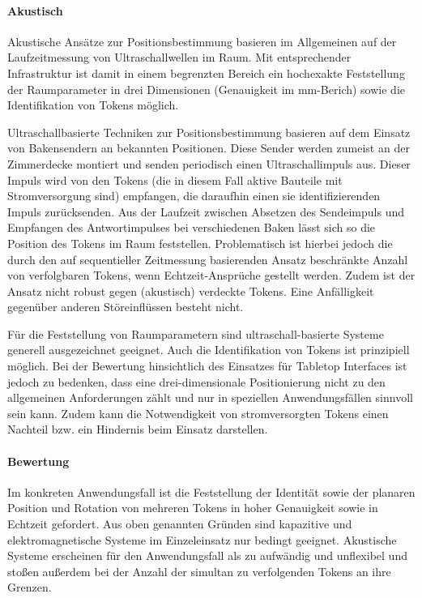 
\paragraph{Akustisch} %
\label{par:akustisch}

Akustische Ansätze zur Positionsbestimmung basieren im Allgemeinen auf der Laufzeitmessung von Ultraschallwellen im Raum. Mit entsprechender Infrastruktur ist damit in einem begrenzten Bereich ein hochexakte Feststellung der Raumparameter in drei Dimensionen (Genauigkeit im mm-Berich) sowie die Identifikation von Tokens möglich.

Ultraschallbasierte Techniken zur Positionsbestimmung basieren auf dem Einsatz von Bakensendern an bekannten Positionen. Diese Sender werden zumeist an der Zimmerdecke montiert und senden periodisch einen Ultraschallimpuls aus. Dieser Impuls wird von den Tokens (die in diesem Fall aktive Bauteile mit Stromversorgung sind) empfangen, die daraufhin einen sie identifizierenden Impuls zurücksenden. Aus der Laufzeit zwischen Absetzen des Sendeimpuls und Empfangen des Antwortimpulses bei verschiedenen Baken lässt sich so die Position des Tokens im Raum feststellen. Problematisch ist hierbei jedoch die durch den auf sequentieller Zeitmessung basierenden Ansatz beschränkte Anzahl von verfolgbaren Tokens, wenn Echtzeit-Ansprüche gestellt werden. Zudem ist der Ansatz nicht robust gegen (akustisch) verdeckte Tokens. Eine Anfälligkeit gegenüber anderen Störeinflüssen besteht nicht. 

Für die Feststellung von Raumparametern sind ultraschall-basierte Systeme generell ausgezeichnet geeignet. Auch die Identifikation von Tokens ist prinzipiell möglich. Bei der Bewertung hinsichtlich des Einsatzes für Tabletop Interfaces ist jedoch zu bedenken, dass eine drei-dimensionale Positionierung nicht zu den allgemeinen Anforderungen zählt und nur in speziellen Anwendungsfällen sinnvoll sein kann. Zudem kann die Notwendigkeit von stromversorgten Tokens einen Nachteil bzw. ein Hindernis beim Einsatz darstellen.


\paragraph{Bewertung} %
\label{par:bewertung}

Im konkreten Anwendungsfall ist die Feststellung der Identität sowie der planaren Position und Rotation von mehreren Tokens in hoher Genauigkeit sowie in Echtzeit gefordert. Aus oben genannten Gründen sind kapazitive und elektromagnetische Systeme im Einzeleinsatz nur bedingt geeignet. Akustische Systeme erscheinen für den Anwendungsfall als zu aufwändig und unflexibel und stoßen außerdem bei der Anzahl der simultan zu verfolgenden Tokens an ihre Grenzen.

